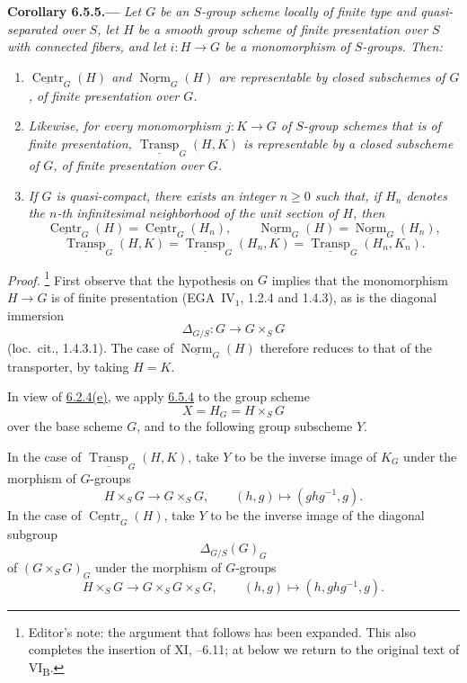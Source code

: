 
\medskip
{}\label{cor:sga3-VIB-6.5.5}%
\noindent\textbf{Corollary 6.5.5.---}
\emph{Let \(G\) be an \(S\)-group scheme locally of finite type
and quasi-separated over \(S\), let \(H\) be a smooth group
scheme of finite presentation over \(S\) with connected fibers,
and let \(i:H\to G\) be a monomorphism of \(S\)-groups. Then:}
\begin{enumerate}
\item[\textup{a)}]\label{concl:sga3-VIB-6.5.5-a}
  \emph{\(\underline{\operatorname{Centr}}_G(H)\) and
  \(\underline{\operatorname{Norm}}_G(H)\) are representable by
  closed subschemes of \(G\), of finite presentation over \(G\).}
\item[\textup{a\(^{\prime}\))}]
  \label{concl:sga3-VIB-6.5.5-aprime}
  \emph{Likewise, for every monomorphism \(j:K\to G\) of
  \(S\)-group schemes that is of finite presentation,
  \(\underline{\operatorname{Transp}}_G(H,K)\) is representable
  by a closed subscheme of \(G\), of finite presentation over
  \(G\).}
\item[\textup{b)}]\label{concl:sga3-VIB-6.5.5-b}
  \emph{If \(G\) is quasi-compact, there exists an integer
  \(n\geq 0\) such that, if \(H_n\) denotes the \(n\)-th
  infinitesimal neighborhood of the unit section of \(H\), then}
  \[
    \underline{\operatorname{Centr}}_G(H)
      =\underline{\operatorname{Centr}}_G(H_n),
    \qquad
    \underline{\operatorname{Norm}}_G(H)
      =\underline{\operatorname{Norm}}_G(H_n),
  \]
  \[
    \underline{\operatorname{Transp}}_G(H,K)
      =\underline{\operatorname{Transp}}_G(H_n,K)
      =\underline{\operatorname{Transp}}_G(H_n,K_n).
  \]
\end{enumerate}

\emph{Proof.}%
\footnote{\label{note:sga3-VIB-66}Editor's note: the argument that
follows has been expanded. This also completes the insertion of
XI, --6.11; at  below we return to the original text of
VI\textsubscript{B}.}
First observe that the hypothesis on \(G\) implies that the
monomorphism \(H\to G\) is of finite presentation
(EGA~IV\(_1\), 1.2.4 and 1.4.3), as is the diagonal immersion
\[
  \Delta_{G/S}:G\longrightarrow G\times_S G
\]
(loc.\ cit., 1.4.3.1). The case of
\(\underline{\operatorname{Norm}}_G(H)\) therefore reduces to
that of the transporter, by taking \(H=K\).

In view of
\hyperref[ex:sga3-VIB-6.2.4-e]{6.2.4\textup{(e)}}, we apply
\hyperref[cor:sga3-VIB-6.5.4]{6.5.4} to the group scheme
\[
  X=H_G=H\times_S G
\]
over the base scheme \(G\), and to the following group subscheme
\(Y\).

In the case of
\(\underline{\operatorname{Transp}}_G(H,K)\), take \(Y\) to be
the inverse image of \(K_G\) under the morphism of \(G\)-groups
\[
  H\times_S G\longrightarrow G\times_S G,
  \qquad
  (h,g)\longmapsto(ghg^{-1},g).
\]
In the case of
\(\underline{\operatorname{Centr}}_G(H)\), take \(Y\) to be the
inverse image of the diagonal subgroup
\[
  \Delta_{G/S}(G)_G
\]
of \((G\times_S G)_G\) under the morphism of \(G\)-groups
\[
  H\times_S G\longrightarrow G\times_S G\times_S G,
  \qquad
  (h,g)\longmapsto(h,ghg^{-1},g).
\]
